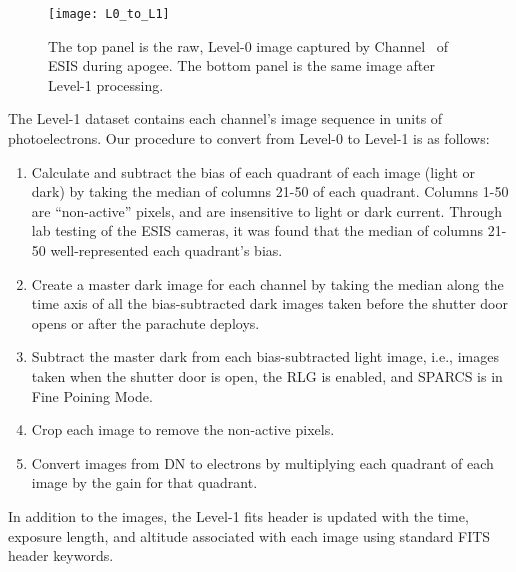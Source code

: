 	    
	    \begin{figure}
	    	\centering
	    	\texttt{[image: L0\_to\_L1]}
	    	\caption{The top panel is the raw, Level-0 image captured by Channel \ of ESIS during apogee. The bottom panel is the same image after Level-1 processing.}
	    	\label{fig:L0_to_L1}
	    \end{figure}
    	
    	
    	The Level-1 dataset contains each channel's image sequence in units of photoelectrons.
    	Our procedure to convert from Level-0 to Level-1 is as follows:
    	
    	\begin{enumerate}
    	    \item Calculate and subtract the bias of each quadrant of each image (light or dark) by taking the median of columns 21-50 of each quadrant. Columns 1-50 are ``non-active'' pixels, and are insensitive to light or dark current. Through lab testing of the ESIS cameras, it was found that the median of columns 21-50 well-represented each quadrant's bias.   
    	    \item Create a master dark image for each channel by taking the median along the time axis of all the bias-subtracted dark images taken before the shutter door opens or after the parachute deploys.
    	    \item Subtract the master dark from each bias-subtracted light image, i.e., images taken when the shutter door is open, the RLG is enabled, and SPARCS is in Fine Poining Mode.
    	    \item Crop each image to remove the non-active pixels.
    	    \item Convert images from DN to electrons by multiplying each quadrant of each image by the gain for that quadrant.
    	\end{enumerate}
    	
	In addition to the images, the Level-1 fits header is updated with the time, exposure length, and altitude associated with each image using standard FITS header keywords.  
	

